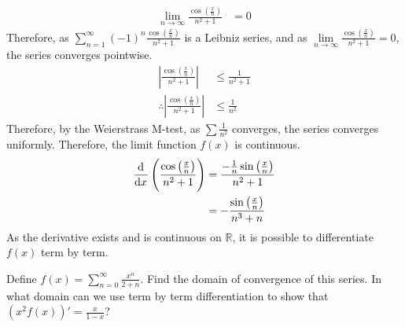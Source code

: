 \documentclass[fleqn, a4paper, 11pt, oneside]{amsart}
\theoremstyle{definition}
\theoremstyle{theorem}
\begin{document}
\begin{solution}
	\begin{align*}
		\lim\limits_{n \to \infty} \frac{\cos\left( \frac{x}{n} \right)}{n^2 + 1} & = 0
	\end{align*}
	Therefore, as $\sum\limits_{n = 1}^{\infty} (-1)^n \frac{\cos\left( \frac{x}{n} \right)}{n^2 + 1}$ is a Leibniz series, and as $\lim\limits_{n \to \infty} \frac{\cos\left( \frac{x}{n} \right)}{n^2 + 1} = 0$, the series converges pointwise.
	\begin{align*}
		\left| \frac{\cos\left( \frac{x}{n} \right)}{n^2 + 1} \right|            & \le \frac{1}{n^2 + 1} \\
		\therefore \left| \frac{\cos\left( \frac{x}{n} \right)}{n^2 + 1} \right| & \le \frac{1}{n^2}
	\end{align*}
	Therefore, by the Weierstrass M-test, as $\sum \frac{1}{n^2}$ converges, the series converges uniformly.
	Therefore, the limit function $f(x)$ is continuous.
	\begin{align*}
		\dod{}{x} \left( \frac{\cos\left( \frac{x}{n} \right)}{n^2 + 1} \right) & = \frac{-\frac{1}{n} \sin\left( \frac{x}{n} \right)}{n^2 + 1} \\
                                                                                        & = -\frac{\sin\left( \frac{x}{n} \right)}{n^3 + n}
	\end{align*}
	As the derivative exists and is continuous on $\mathbb{R}$, it is possible to differentiate $f(x)$ term by term.
\end{solution}

\begin{question}
	Define $f(x) = \sum\limits_{n = 0}^{\infty} \frac{x^n}{2 + n}$.
	Find the domain of convergence of this series.
	In what domain can we use term by term differentiation to show that $\left( x^2 f(x) \right)' = \frac{x}{1 - x}$?
\end{question}
\end{document}
